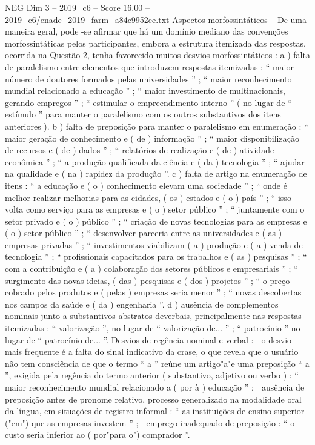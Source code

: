 \begin{textsample}{NEG Dim 3 – 2019\_c6 – Score 16.00 – 2019\_c6/enade\_2019\_farm\_a84c9952ee.txt}
Aspectos morfossintáticos – De uma maneira geral, pode -se afirmar que há um domínio mediano das convenções morfossintáticas pelos participantes, embora a estrutura itemizada das respostas, ocorrida na Questão 2, tenha favorecido muitos desvios morfossintáticos : a ) falta de paralelismo entre elementos que introduzem respostas itemizadas : “ maior número de doutores formados pelas universidades ” ; “ maior reconhecimento mundial relacionado a educação ” ; “ maior investimento de multinacionais, gerando empregos ” ; “ estimular o empreendimento interno ” ( no lugar de “ estímulo ” para manter o paralelismo com os outros substantivos dos itens anteriores ). b ) falta de preposição para manter o paralelismo em enumeração : “ maior geração de conhecimento e ( de ) informação ” ; “ maior disponibilização de recursos e ( de ) dados ” ; “ relatórios de realização e ( de ) atividade econômica ” ; “ a produção qualificada da ciência e ( da ) tecnologia ” ; “ ajudar na qualidade e ( na ) rapidez da produção ”. c ) falta de artigo na enumeração de itens : “ a educação e ( o ) conhecimento elevam uma sociedade ” ; “ onde é melhor realizar melhorias para as cidades, ( os ) estados e ( o ) país ” ; “ isso volta como serviço para as empresas e ( o ) setor público ” ; “ juntamente com o setor privado e ( o ) público ” ; “ criação de novas tecnologias para as empresas e ( o ) setor público ” ; “ desenvolver parceria entre as universidades e ( as ) empresas privadas ” ; “ investimentos viabilizam ( a ) produção e ( a ) venda de tecnologia ” ; “ profissionais capacitados para os trabalhos e ( as ) pesquisas ” ; “ com a contribuição e ( a ) colaboração dos setores públicos e empresariais ” ; “ surgimento das novas ideias, ( das ) pesquisas e ( dos ) projetos ” ; “ o preço cobrado pelos produtos e ( pelas ) empresas seria menor ” ; “ novas descobertas nos campos da saúde e ( da ) engenharia ”. d ) ausência de complementos nominais junto a substantivos abstratos deverbais, principalmente nas respostas itemizadas : “ valorização ”, no lugar de “ valorização de... ” ; “ patrocínio ” no lugar de “ patrocínio de... ”.
Desvios de regência nominal e verbal :  o desvio mais frequente é a falta do sinal indicativo da crase, o que revela que o usuário não tem consciência de que o termo “ a ” reúne um artigo"a"e uma preposição “ a ”, exigida pela regência do termo anterior ( substantivo, adjetivo ou verbo ) : “ maior reconhecimento mundial relacionado a ( por à ) educação ” ;  ausência de preposição antes de pronome relativo, processo generalizado na modalidade oral da língua, em situações de registro informal : “ as instituições de ensino superior ("em") que as empresas investem ” ;  emprego inadequado de preposição : “ o custo seria inferior ao ( por"para o") comprador ”.

\end{textsample}

